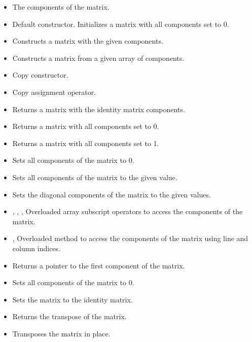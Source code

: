 \documentclass[a4paper,onecolumn,11pt]{doofus}
\begin{document}
\begin{itemize}
\item {} The components of the matrix.
\item {} Default constructor. Initializes a matrix with all components set to 0.
\item {} Constructs a matrix with the given components.
\item {} Constructs a matrix from a given array of components.
\item {} Copy constructor.
\item {} Copy assignment operator.
\item {} Returns a matrix with the identity matrix components.
\item {} Returns a matrix with all components set to 0.
\item {} Returns a matrix with all components set to 1.
\item {} Sets all components of the matrix to 0.
\item {} Sets all components of the matrix to the given value.
\item {} Sets the diagonal components of the matrix to the given values.
\item {}, , ,  Overloaded array subscript operators to access the components of the matrix.
\item {},  Overloaded  method to access the components of the matrix using line and column indices.
\item {} Returns a pointer to the first component of the matrix.
\item {} Sets all components of the matrix to 0.
\item {} Sets the matrix to the identity matrix.
\item {} Returns the transpose of the matrix.
\item {} Transposes the matrix in place.

\end{itemize}
\end{document}
